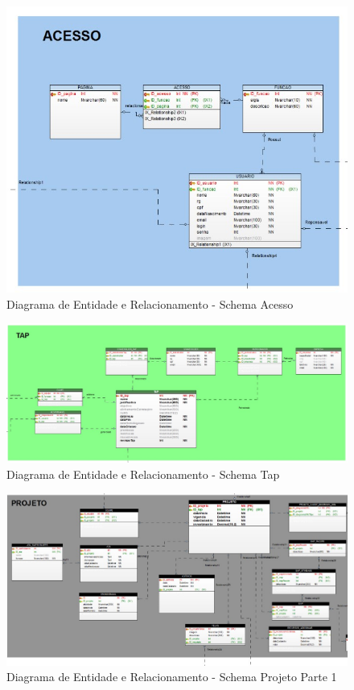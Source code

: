 \documentclass{acm_proc_article-sp}
\begin{document}
\begin{appendices}
\begin{figure}[h]
\centering %
\includegraphics[width=1\textwidth]{DER_acesso.jpg} %
\caption{Diagrama de Entidade e Relacionamento - Schema Acesso}
\end{figure} 

\begin{figure}[h]
\centering %
\includegraphics[width=1\textwidth]{DER_tap.jpg} %
\caption{Diagrama de Entidade e Relacionamento - Schema Tap}
\end{figure}

\begin{figure}[h]
\centering %
\includegraphics[width=1\textwidth]{DER_projeto_p1.jpg} %
\caption{Diagrama de Entidade e Relacionamento - Schema Projeto Parte 1}
\end{figure}


\end{appendices}
\end{document}
